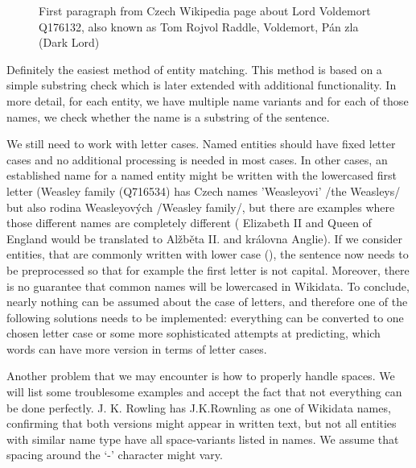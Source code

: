 \begin{figure}


\caption{First paragraph from Czech Wikipedia page about Lord Voldemort Q176132, also known as Tom Rojvol Raddle, Voldemort, Pán zla (Dark Lord) }


\end{figure}


 Definitely the easiest method of entity matching. This method is based on a simple substring check which is later extended with additional functionality. In more detail, for each entity, we have multiple name variants and for each of those names, we check whether the name is a substring of the sentence.

We still need to work with letter cases. Named entities should have fixed letter cases and no additional processing is needed in most cases. In other cases, an established name for a named entity might be written with the lowercased first letter (Weasley family (Q716534) has Czech names 'Weasleyovi' /the Weasleys/ but also rodina Weasleyových /Weasley family/, but there are examples where those different names are completely different ( Elizabeth II and Queen of England would be translated to Alžběta II. and královna Anglie). If we consider entities, that are commonly written with lower case (), the sentence now needs to be preprocessed so that for example the first letter is not capital. Moreover, there is no guarantee that common names will be lowercased in Wikidata. To conclude, nearly nothing can be assumed about the case of letters, and therefore one of the following solutions needs to be implemented: everything can be converted to one chosen letter case or some more sophisticated attempts at predicting, which words can have more version in terms of letter cases.

Another problem that we may encounter is how to properly handle spaces. We will list some troublesome examples and accept the fact that not everything can be done perfectly. J. K. Rowling has J.K.Rownling as one of Wikidata names, confirming that both versions might appear in written text, but not all entities with similar name type have all space-variants listed in names. We assume that spacing around the ‘-’ \todo{-} character might vary.

